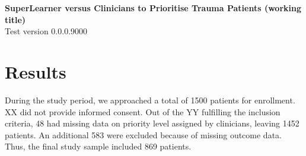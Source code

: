 \documentclass[10pt,letterpaper]{article}\usepackage[]{graphicx}\usepackage[]{color}
\begin{document}
{\Large
  \noindent\textbf{SuperLearner versus Clinicians to Prioritise Trauma Patients (working title)}
} \newline
\\
{\large
  Test version 0.0.0.9000
}
\section*{Results}
During the study period, we approached a total of 1500 patients
for enrollment. XX did not provide informed consent. Out of the YY fulfilling
the inclusion criteria, 48 had missing data on priority level
assigned by clinicians, leaving 1452
patients. An additional 583 were excluded because of missing outcome
data. Thus, the final study sample included
869 patients.

\end{document}
